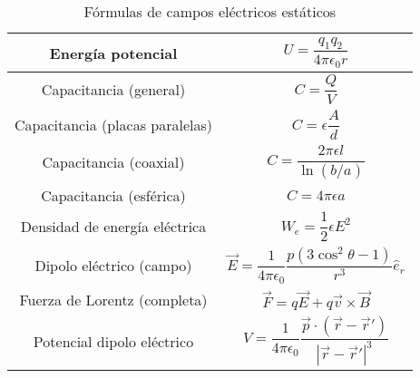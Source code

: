 \documentclass[10pt,conference]{IEEEtran}
\numberwithin{table}{section}
\begin{document}
\begin{table}[H]
{\begin{tabular}{|c|c|}
            \hline
            Energía potencial               & $U = \dfrac{q_1 q_2}{4 \pi \epsilon_0 r}$                                                            \\
            \hline
            Capacitancia (general)          & $C = \dfrac{Q}{V}$                                                                                   \\
            \hline
            Capacitancia (placas paralelas) & $C = \epsilon \dfrac{A}{d}$                                                                          \\
            \hline
            Capacitancia (coaxial)          & $C = \dfrac{2 \pi \epsilon l}{\ln(b/a)}$                                                             \\
            \hline
            Capacitancia (esférica)         & $C = 4 \pi \epsilon a$                                                                               \\
            \hline
            Densidad de energía eléctrica   & $W_e = \dfrac{1}{2} \epsilon E^2$                                                                    \\
            \hline
            Dipolo eléctrico (campo)        & $\vec{E} = \dfrac{1}{4 \pi \epsilon_0} \dfrac{p (3 \cos^2 \theta - 1)}{r^3} \hat{e}_r$               \\
            \hline
            Fuerza de Lorentz (completa)    & $\vec{F} = q \vec{E} + q \vec{v} \times \vec{B}$                                                     \\
            \hline
            Potencial dipolo eléctrico      & $V = \dfrac{1}{4 \pi \epsilon_0} \dfrac{\vec{p} \cdot (\vec{r} - \vec{r}')}{|\vec{r} - \vec{r}'|^3}$ \\
            \hline
        \end{tabular}
    }
    \caption{Fórmulas de campos eléctricos estáticos}
\end{table}

\end{document}
